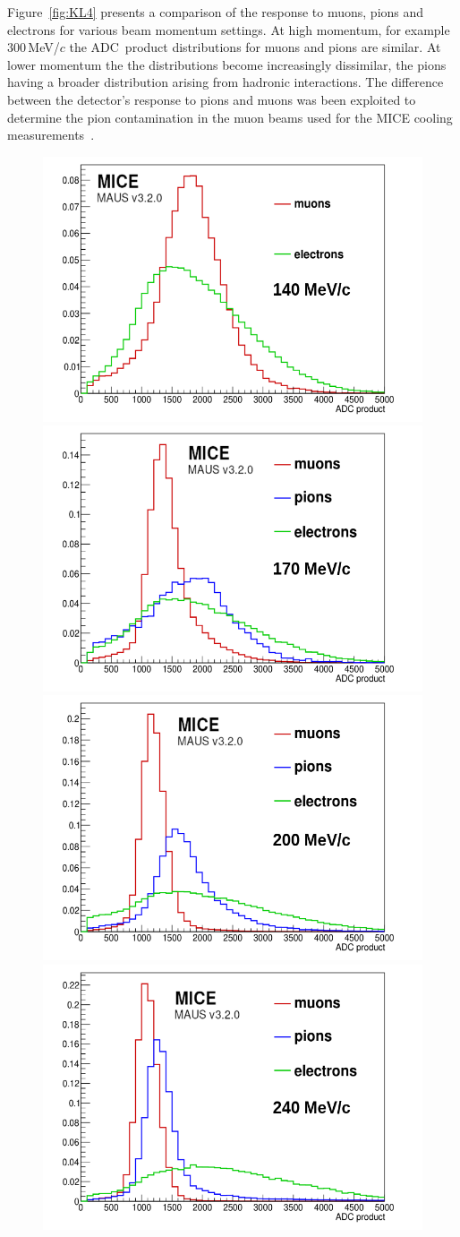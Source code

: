 Figure~\ref{fig:KL4} presents a comparison of the response to muons,
pions and electrons for various beam momentum settings.
At high momentum, for example 300\,MeV/$c$ the ADC~product
distributions for muons and pions are similar.
At lower momentum the the distributions become increasingly dissimilar,
the pions having a broader distribution arising from hadronic
interactions.
The difference between the detector's response to pions and muons was
been exploited to determine the pion contamination in the muon beams
used for the MICE cooling measurements~\cite{2016JInst..11P3001A}.  
\begin{figure}
  \begin{center}
    \includegraphics[width=0.45\columnwidth]{./04-KL/Figures/mu_vs_e_140MEV-edited.png}
    \includegraphics[width=0.45\columnwidth]{./04-KL/Figures/mu_vs_pi_vs_e_170MEV-edited.png} 
    \includegraphics[width=0.45\columnwidth]{./04-KL/Figures/mu_vs_pi_vs_e_200MEV-edited.png}
    \includegraphics[width=0.45\columnwidth]{./04-KL/Figures/mu_vs_pi_vs_e_240MEV-edited.png}  	

\end{center}
\end{figure}
